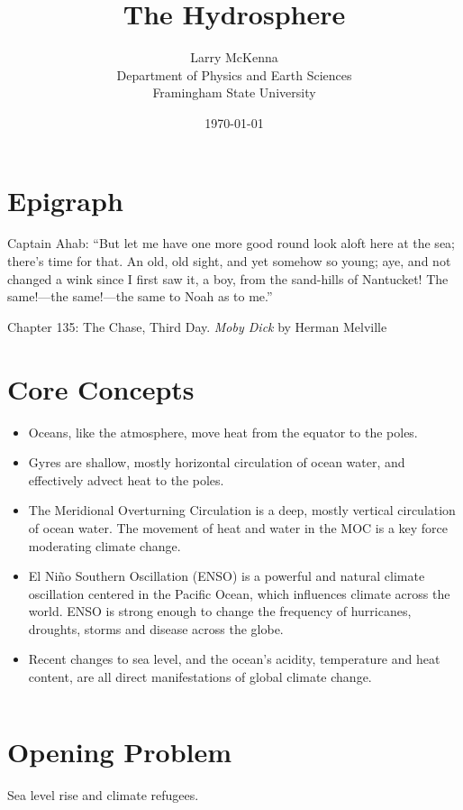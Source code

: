 \documentclass[amstex,12pt]{book}
\begin{document}
\title{The Hydrosphere}\label{Hydrosphere}
\date{\today}
\author{Larry McKenna\\Department of Physics and Earth Sciences\\Framingham State University}
\maketitle
\section*{Epigraph} \label{Epigraph}
\epigraph{Captain Ahab: ``But let me have one more good round look aloft here at the sea; there's time for that. An old, old sight, and yet somehow so young; aye, and not changed a wink since I first saw it, a boy, from the sand-hills of Nantucket! The same!---the same!---the same to Noah as to me.''}{Chapter 135: The Chase, Third Day. \textit{Moby Dick} by Herman Melville } 

\section{Core Concepts} \label{Core Concepts}
\begin{itemize}
	\item	Oceans, like the atmosphere, move heat from the equator to the poles.
	\item	Gyres are shallow, mostly horizontal circulation of ocean water, and effectively advect heat to the poles.
	\item The Meridional Overturning Circulation is a deep, mostly vertical circulation of ocean water. The movement of heat and water in the MOC is a key force moderating climate change.
	\item	El Ni\~no Southern Oscillation (ENSO) is a powerful and natural climate oscillation centered in the Pacific Ocean, which influences climate across the world. ENSO is strong enough to change the frequency of hurricanes, droughts, storms and disease across the globe.    
	\item	Recent changes to sea level, and the ocean's acidity, temperature and heat content, are all direct manifestations of global climate change. 
\end{itemize}
$\ $\\

\section{Opening Problem} \label{Opening Problem}
Sea level rise and climate refugees. 
$\ $\\
\end{document}
